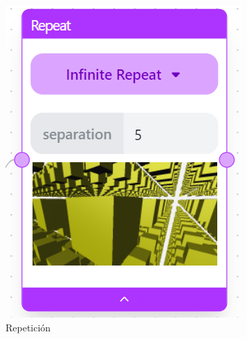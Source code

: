 \begin{figure}[!h]
\begin{subfigure}[b]{0.21\textwidth}
        \includegraphics[width=\textwidth]{Plantilla-TFG-master/img/nodo_rep.png}
        \caption{Repetición}
    \end{subfigure}
    \hspace{10pt}
    \begin{subfigure}[b]{0.21\textwidth}
        \centering

\end{subfigure}
\end{figure}
